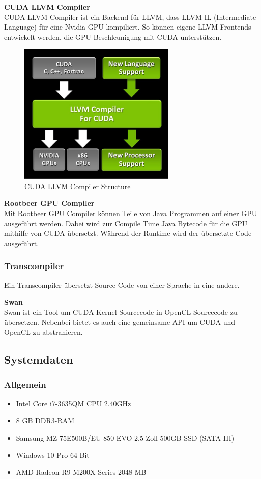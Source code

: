 \newpage

\textbf{CUDA LLVM Compiler}\\
CUDA LLVM Compiler ist ein Backend für LLVM, dass LLVM IL (Intermediate Language) für eine Nvidia GPU kompiliert. So können eigene LLVM Frontends entwickelt werden, die GPU Beschleunigung mit CUDA unterstützen.

\begin{figure}[!h]
	\begin{center}
		\includegraphics[width=7.5cm]{images/LLVM_Compiler_structure.jpg}
		\caption{CUDA LLVM Compiler Structure\cite{cudallvm}}
	\end{center}
\end{figure}

\textbf{Rootbeer GPU Compiler}\\
Mit Rootbeer GPU Compiler können Teile von Java Programmen auf einer GPU ausgeführt werden. Dabei wird zur Compile Time Java Bytecode für die GPU mithilfe von CUDA übersetzt. Während der Runtime wird der übersetzte Code ausgeführt.\cite{rootbeer1}

\subsubsection{Transcompiler}
Ein Transcompiler übersetzt Source Code von einer Sprache in eine andere.

\textbf{Swan}\\
Swan ist ein Tool um CUDA Kernel Sourcecode in OpenCL Sourcecode zu übersetzen. Nebenbei bietet es auch eine gemeinsame API um CUDA und OpenCL zu abstrahieren.\cite{swan}
\newpage
\subsection{Systemdaten}
\subsubsection{Allgemein}
\begin{itemize}
\item Intel Core i7-3635QM CPU 2.40GHz
\item 8 GB DDR3-RAM
\item Samsung MZ-75E500B/EU 850 EVO 2,5 Zoll 500GB SSD (SATA III)
\item Windows 10 Pro 64-Bit
\item AMD Radeon R9 M200X Series 2048 MB

\end{itemize}
